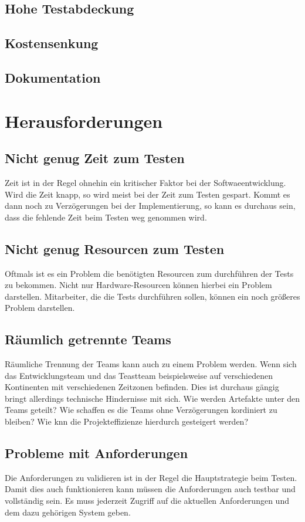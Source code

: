 \section{Hohe Testabdeckung}
\section{Kostensenkung}
\section{Dokumentation}

\chapter{Herausforderungen}
\section{Nicht genug Zeit zum Testen}
Zeit ist in der Regel ohnehin ein kritischer Faktor bei der Softwaeentwicklung. Wird die Zeit knapp, so wird meist bei der Zeit zum Testen gespart. Kommt es dann noch zu Verz\"ogerungen bei der Implementierung, so kann es durchaus sein, dass die fehlende Zeit beim Testen weg genommen wird.

\section{Nicht genug Resourcen zum Testen}
Oftmals ist es ein Problem die ben\"otigten Resourcen zum durchf\"uhren der Tests zu bekommen. Nicht nur Hardware-Resourcen k\"onnen hierbei ein Problem darstellen. Mitarbeiter, die die Tests durchf\"uhren sollen, k\"onnen ein noch gr\"oßeres Problem darstellen.

\section{R\"aumlich getrennte Teams}
R\"aumliche Trennung der Teams kann auch zu einem Problem werden. Wenn sich das Entwicklungsteam und das Teastteam beispielsweise auf verschiedenen Kontinenten mit verschiedenen Zeitzonen befinden. Dies ist durchaus g\"angig bringt allerdings technische Hindernisse mit sich. Wie werden Artefakte unter den Teams geteilt? Wie schaffen es die Teams ohne Verz\"ogerungen kordiniert zu bleiben? Wie knn die Projekteffizienze hierdurch gesteigert werden?

\section{Probleme mit Anforderungen}
Die Anforderungen zu validieren ist in der Regel die Hauptstrategie beim Testen. Damit dies auch funktionieren kann m\"ussen die Anforderungen auch testbar und vollst\"andig sein. Es muss jederzeit Zugriff auf die aktuellen Anforderungen und dem dazu geh\"origen System geben. 

